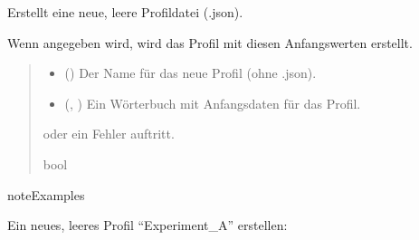 \documentclass[letterpaper,10pt,english]{sphinxmanual}
\begin{document}
\begin{fulllineitems}
\begin{fulllineitems}
\end{fulllineitems}


\begin{fulllineitems}
\label{\detokenize{modulab/profile_manager:modules.profile.ProfileManager.ProfileManager.create_profile}}
\pysigstartsignatures
\pysiglinewithargsret
{}
{\sphinxparamcomma {}}
{}
\pysigstopsignatures
\sphinxAtStartPar
Erstellt eine neue, leere Profildatei (.json).

\sphinxAtStartPar
Wenn  angegeben wird, wird das Profil mit diesen
Anfangswerten erstellt.
\begin{quote}\begin{description}
\begin{itemize}
\item {} 
\sphinxAtStartPar
{} () \textendash{} Der Name für das neue Profil (ohne .json).

\item {} 
\sphinxAtStartPar
{} (, ) \textendash{} Ein Wörterbuch mit Anfangsdaten
für das Profil.

\end{itemize}

\sphinxAtStartPar
\begin{description}
\sphinxAtStartPar
oder ein Fehler auftritt.

\end{description}


\sphinxAtStartPar
bool

\end{description}\end{quote}

\begin{sphinxadmonition}{note}{Examples}

\sphinxAtStartPar
Ein neues, leeres Profil “Experiment\_A” erstellen:


\end{sphinxadmonition}
\end{fulllineitems}
\end{fulllineitems}
\end{document}
